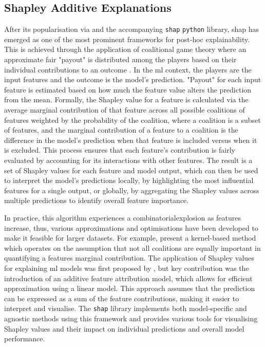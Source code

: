 \subsection{Shapley Additive Explanations}

After its popularisation via \cite{Lundberg2017} and the accompanying \texttt{shap} \texttt{python} library, \acrfull{shap} has emerged as one of the most prominent frameworks for post-hoc explainability. This is achieved through the application of coalitional game theory where an approximate fair "payout" is distributed among the players based on their individual contributions to an outcome \citep{Shapley1953}. In the \acrshort{ml} context, the players are the input features and the outcome is the model's prediction. "Payout" for each input feature is estimated based on how much the feature value alters the prediction from the mean. Formally, the Shapley value for a feature is calculated via the average marginal contribution of that feature across all possible coalitions of features weighted by the probability of the coalition, where a coalition is a subset of features, and the marginal contribution of a feature to a coalition is the difference in the model's prediction when that feature is included versus when it is excluded. This process ensures that each feature's contribution is fairly evaluated by accounting for its interactions with other features. The result is a set of Shapley values for each feature and model output, which can then be used to interpret the model's predictions locally, by highlighting the most influential features for a single output, or globally, by aggregating the Shapley values across multiple predictions to identify overall feature importance.

In practice, this algorithm experiences a \gls{combinatorialexplosion} as features increase, thus, various approximations and optimisations have been developed to make it feasible for larger datasets. For example, \cite{Lundberg2017} present a kernel-based method which operates on the assumption that not all coalitions are equally important in quantifying a features marginal contribution. The application of Shapley values for explaining \acrshort{ml} models was first proposed by \cite{trumbelj2011}, but \cite{Lundberg2017} key contribution was the introduction of an additive feature attribution model, which allows for efficient approximation using a linear model. This approach assumes that the prediction can be expressed as a sum of the feature contributions, making it easier to interpret and visualise. The \texttt{shap} library implements both model-specific and agnostic methods using this framework and provides various tools for visualising Shapley values and their impact on individual predictions and overall model performance.


